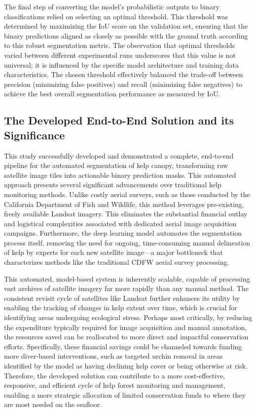 \documentclass{article}
\begin{document}
The final step of converting the model's probabilistic outputs to binary classifications relied on selecting an optimal threshold. This threshold was determined by maximizing the IoU score on the validation set, ensuring that the binary predictions aligned as closely as possible with the ground truth according to this robust segmentation metric. The observation that optimal thresholds varied between different experimental runs underscores that this value is not universal; it is influenced by the specific model architecture and training data characteristics. The chosen threshold effectively balanced the trade-off between precision (minimizing false positives) and recall (minimizing false negatives) to achieve the best overall segmentation performance as measured by IoU.

\subsection{The Developed End-to-End Solution and its Significance}

This study successfully developed and demonstrated a complete, end-to-end pipeline for the automated segmentation of kelp canopy, transforming raw satellite image tiles into actionable binary prediction masks. This automated approach presents several significant advancements over traditional kelp monitoring methods. Unlike costly aerial surveys, such as those conducted by the California Department of Fish and Wildlife, this method leverages pre-existing, freely available Landsat imagery. This eliminates the substantial financial outlay and logistical complexities associated with dedicated aerial image acquisition campaigns. Furthermore, the deep learning model automates the segmentation process itself, removing the need for ongoing, time-consuming manual delineation of kelp by experts for each new satellite image—a major bottleneck that characterizes methods like the traditional CDFW aerial survey processing. 

This automated, model-based system is inherently scalable, capable of processing vast archives of satellite imagery far more rapidly than any manual method. The consistent revisit cycle of satellites like Landsat further enhances its utility by enabling the tracking of changes in kelp extent over time, which is crucial for identifying areas undergoing ecological stress. Perhaps most critically, by reducing the expenditure typically required for image acquisition and manual annotation, the resources saved can be reallocated to more direct and impactful conservation efforts. Specifically, these financial savings could be channeled towards funding more diver-based interventions, such as targeted urchin removal in areas identified by the model as having declining kelp cover or being otherwise at risk. Therefore, the developed solution can contribute to a more cost-effective, responsive, and efficient cycle of kelp forest monitoring and management, enabling a more strategic allocation of limited conservation funds to where they are most needed on the seafloor.
\end{document}
